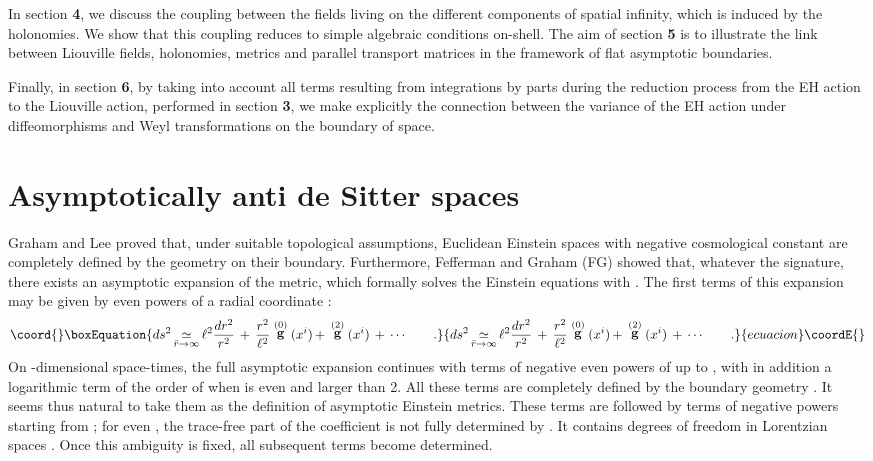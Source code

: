 \documentclass[a4paper,10pt]{article}
\begin{document}
In section {\bf 4}, we discuss the coupling between the fields living on the
different components of spatial infinity, which is induced by
the holonomies. We show that this coupling 
reduces to simple algebraic conditions
on-shell. The aim of section {\bf 5} is to illustrate the link between 
Liouville fields, holonomies, \coordHE{} metrics and \coordHE{} parallel
transport matrices in the framework of flat asymptotic boundaries.
 
Finally, in section {\bf 6}, by taking into account all  
terms resulting from integrations by parts during the reduction process from 
the EH action to the Liouville action, performed in section {\bf 3}, we make 
explicitly the  
connection between the variance of the EH action under diffeomorphisms 
and Weyl transformations on the boundary of  \coordHE{} space. 
 
\section{Asymptotically anti de Sitter spaces} 
 
Graham and Lee \cite{GL} proved that, under suitable topological 
assumptions, Euclidean 
Einstein spaces with negative cosmological constant \myHighlight{$\Lambda$}\coordHE{} 
are completely defined by the geometry on 
their boundary. Furthermore, Fefferman and Graham (FG) \cite{FG}  
showed that, whatever the signature, 
there exists an asymptotic expansion of the metric, which formally  
solves the Einstein equations with \coordHE{}. 
The first terms of this expansion may be given by even powers of  
a radial coordinate \coordHE{}: 
\begin{equation}\coord{}\boxEquation{ 
\label{FG} 
ds^2  
\asym 
 \ell^2 {dr^2\over{r^2}} \, + \, 
\frac {r^2} {\ell^2} \stackrel {(0)} {\bf g} (x^i)  \, + \, 
\stackrel {(2)} {\bf g} (x^i) \, + \, \cdots \qquad . 
}{ 
ds^2  
\asym 
 \ell^2 {dr^2\over{r^2}} \, + \, 
\frac {r^2} {\ell^2} \stackrel {(0)} {\bf g} (x^i)  \, + \, 
\stackrel {(2)} {\bf g} (x^i) \, + \, \cdots \qquad . 
}{ecuacion}\coordE{}\end{equation} 
On \coordHE{}-dimensional space-times, the full asymptotic expansion 
continues with terms of negative even  powers of \coordHE{} up 
to \coordHE{}, with in addition a logarithmic term of  
the order 
of \coordHE{} when \coordHE{} is even and larger than 2. All these terms 
are completely defined by the boundary geometry  
\coordHE{}. It seems thus natural 
to take them as the definition of asymptotic Einstein metrics. 
These terms are 
followed by terms of negative powers 
starting from \coordHE{}; for even \coordHE{}, 
the trace-free part of the \coordHE{} 
coefficient is not fully determined by \coordHE{}. It 
contains degrees of freedom in Lorentzian spaces \cite{NB,BERS}.  
Once this ambiguity is fixed,  
all subsequent terms become determined. 
 
\end{document}
